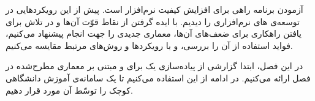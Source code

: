 
آزمودن برنامه راهی برای افزایش کیفیت نرم‌افزار است. پیش از این رویکردهایی در توسعه‌ی های نرم‌افزاری را دیدیم. با ایده گرفتن از نقاط قوّت آن‌ها و در تلاش برای یافتن راهکاری برای ضعف‌های آن‌ها، معماری جدیدی را جهت انجام  پیشنهاد می‌کنیم، فواید استفاده از آن را بررسی، و با رویکردها و روش‌های مرتبط مقایسه می‌کنیم.






%


در این فصل، ابتدا گزارشی از پیاده‌سازی یک   برای  و مبتنی بر معماری مطرح‌شده در فصل  ارائه می‌کنیم. در ادامه از این  استفاده می‌کنیم تا یک سامانه‌ی آموزش دانشگاهی کوچک را توسّط آن مورد  قرار دهیم.




